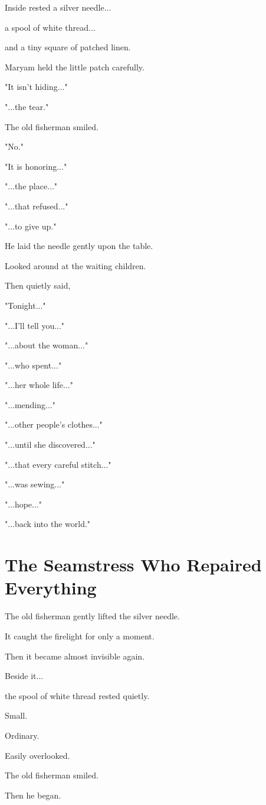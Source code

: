 \documentclass[12pt,openany]{book}
\begin{document}
Inside rested a silver needle...

a spool of white thread...

and a tiny square of patched linen.

Maryam held the little patch carefully.

"It isn't hiding..."

"...the tear."

The old fisherman smiled.

"No."

"It is honoring..."

"...the place..."

"...that refused..."

"...to give up."

He laid the needle gently upon the table.

Looked around at the waiting children.

Then quietly said,

"Tonight..."

"...I'll tell you..."

"...about the woman..."

"...who spent..."

"...her whole life..."

"...mending..."

"...other people's clothes..."

"...until she discovered..."

"...that every careful stitch..."

"...was sewing..."

"...hope..."

"...back into the world."
\section*{The Seamstress Who Repaired Everything}

The old fisherman gently lifted the silver needle.

It caught the firelight for only a moment.

Then it became almost invisible again.

Beside it...

the spool of white thread rested quietly.

Small.

Ordinary.

Easily overlooked.

The old fisherman smiled.

Then he began.
\end{document}
